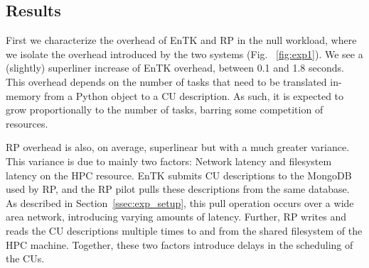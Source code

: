 \documentclass{bmcart}
\def\texttt{[image: ]}
\begin{document}
\subsection{Results}\label{ssec:exp_results}



First we characterize the overhead of EnTK and RP in the null workload, where
we isolate the overhead introduced by the two systems
(Fig. ~\ref{fig:exp1}). We see a (slightly) superliner increase of EnTK
overhead, between 0.1 and 1.8 seconds. This overhead depends on the number of
tasks that need to be translated in-memory from a Python object to a CU 
description. As such, it is expected to grow proportionally to the
number of tasks, barring some competition of resources.

RP overhead is also, on average, superlinear but with a much greater
variance. This variance is due to mainly two factors: Network latency and
filesystem latency on the HPC resource. EnTK submits CU descriptions to the
MongoDB used by RP, and the RP pilot pulls these descriptions from the same
database. As described in Section~\ref{ssec:exp_setup}, this pull operation
occurs over a wide area network, introducing varying amounts of latency.
Further, RP writes and reads the CU descriptions multiple times to and
from the shared filesystem of the HPC machine. Together, these two factors
introduce delays in the scheduling of the CUs.

\end{document}
